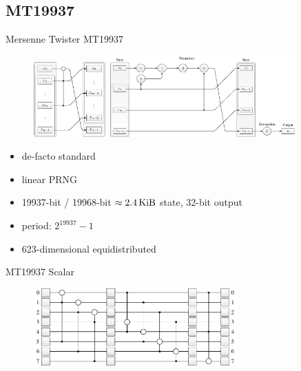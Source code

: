 \documentclass[aspectratio=169]{beamer}
\begin{document}
    \subsection{MT19937}
    \begin{frame}{Mersenne Twister MT19937}
      \begin{figure}
        \includegraphics[width=0.25\textwidth]{figures/mt19937_transition_short.pdf}
        \hfill
        \includegraphics[width=0.637\textwidth]{figures/mt19937_scheme.pdf}
      \end{figure}
      \begin{itemize}
        \item de-facto standard
        \item linear PRNG
        \item 19937-bit / 19968-bit $\approx 2.4\, \mathrm{KiB}$ state, 32-bit output
        \item period: $2^{19937}-1$
        \item 623-dimensional equidistributed
      \end{itemize}
    \end{frame}

    \begin{frame}{MT19937 Scalar}
      \begin{figure}
        \includegraphics[width=0.7\textwidth]{figures/mt19937_loop_scheme.pdf}
      \end{figure}
    \end{frame}
\end{document}
